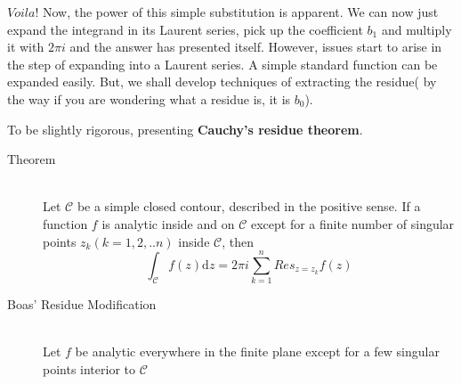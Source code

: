 \documentclass[11pt]{article}
\begin{document}
\begin{sloppypar}
$Voila!$ Now, the power of this simple substitution is apparent. We can now just expand the integrand in its Laurent series, pick up the coefficient $b_{1}$ and multiply it with $2\pi i$ and the answer has presented itself. However, issues start to arise in the step of expanding into a Laurent series. A simple standard function can be expanded easily. But, we shall develop techniques of extracting the residue( by the way if you are wondering what a residue is, it is $b_{0}$).

To be slightly rigorous, presenting \textbf{Cauchy\rq{}s residue theorem}.
\begin{description}
\item[Theorem] \hfill \\
	Let $\mathcal{C}$ be a simple closed contour, described in the positive sense. If a function $f$ is analytic inside and on $\mathcal{C}$ except for a finite number of singular points $z_{k}(k=1,2,..n)$ inside $\mathcal{C}$, then
$$\int_{\mathcal{C}}f(z)\mathrm{d}z = 2\pi i\sum_{k=1}^{n}Res_{z=z_{k}}f(z)$$

\item[Boas\rq{} Residue Modification] \hfill \\
	Let $f$ be analytic everywhere in the finite plane except for a few singular points interior to $\mathcal{C}$
\end{description}
\end{sloppypar}
\end{document}
